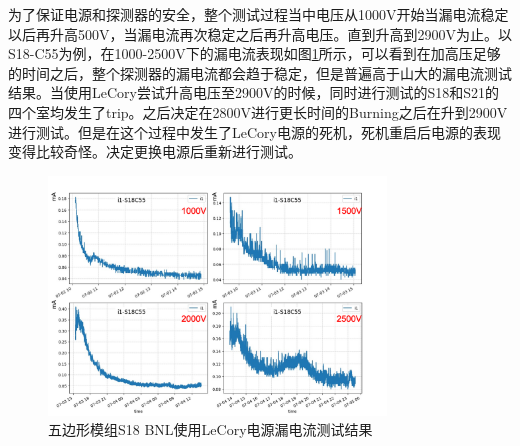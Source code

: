 为了保证电源和探测器的安全，整个测试过程当中电压从1000V开始当漏电流稳定以后再升高500V，当漏电流再次稳定之后再升高电压。直到升高到2900V为止。以S18-C55为例，在1000-2500V下的漏电流表现如图\ref{fig:LeakCurrent_LeCory}所示，可以看到在加高压足够的时间之后，整个探测器的漏电流都会趋于稳定，但是普遍高于山大的漏电流测试结果。当使用LeCory尝试升高电压至2900V的时候，同时进行测试的S18和S21的四个室均发生了trip。之后决定在2800V进行更长时间的Burning之后在升到2900V进行测试。但是在这个过程中发生了LeCory电源的死机，死机重启后电源的表现变得比较奇怪。决定更换电源后重新进行测试。
\begin{figure}[htb]
    \begin{center}
    \includegraphics[width=0.8\textwidth,clip]{figures/Chapter3/LeakCurrent_LeCory.png}
    \end{center}
    \caption[五边形模组S18 BNL使用LeCory电源漏电流测试结果]{五边形模组S18 BNL使用LeCory电源漏电流测试结果}
    \label{fig:LeakCurrent_LeCory}
\end{figure}

